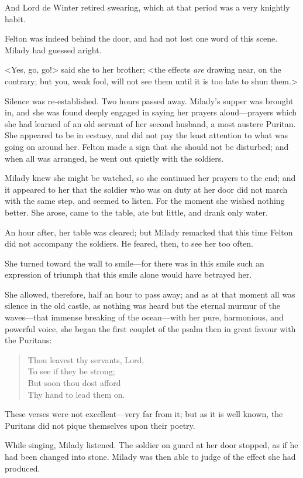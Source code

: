 And Lord de Winter retired swearing, which at that period was a very knightly habit. 

Felton was indeed behind the door, and had not lost one word of this scene. Milady had guessed aright. 

<Yes, go, go!> said she to her brother; <the effects \emph{are} drawing near, on the contrary; but you, weak fool, will not see them until it is too late to shun them.> 

Silence was re-established. Two hours passed away. Milady's supper was brought in, and she was found deeply engaged in saying her prayers aloud—prayers which she had learned of an old servant of her second husband, a most austere Puritan. She appeared to be in ecstasy, and did not pay the least attention to what was going on around her. Felton made a sign that she should not be disturbed; and when all was arranged, he went out quietly with the soldiers. 

Milady knew she might be watched, so she continued her prayers to the end; and it appeared to her that the soldier who was on duty at her door did not march with the same step, and seemed to listen. For the moment she wished nothing better. She arose, came to the table, ate but little, and drank only water. 

An hour after, her table was cleared; but Milady remarked that this time Felton did not accompany the soldiers. He feared, then, to see her too often. 

She turned toward the wall to smile—for there was in this smile such an expression of triumph that this smile alone would have betrayed her. 

She allowed, therefore, half an hour to pass away; and as at that moment all was silence in the old castle, as nothing was heard but the eternal murmur of the waves—that immense breaking of the ocean—with her pure, harmonious, and powerful voice, she began the first couplet of the psalm then in great favour with the Puritans: 
\begin{verse}
Thou leavest thy servants, Lord,\\
To see if they be strong;\\
But soon thou dost afford\\
Thy hand to lead them on.
\end{verse}

These verses were not excellent—very far from it; but as it is well known, the Puritans did not pique themselves upon their poetry. 

While singing, Milady listened. The soldier on guard at her door stopped, as if he had been changed into stone. Milady was then able to judge of the effect she had produced. 

